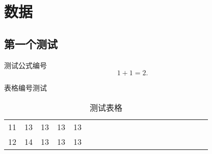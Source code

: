 
\appendix
{} %

\chapter{数据}

\section{第一个测试}
测试公式编号
\begin{equation}
  1+1=2.
\end{equation}

表格编号测试

\begin{table}[h]
  \centering
  \caption{测试表格}
  \begin{tabular}{*{20}c}
    \hline
    11 & 13  & 13  & 13  & 13 \\
    12 & 14  & 13  & 13  & 13 \\
    \hline
  \end{tabular}
\end{table}